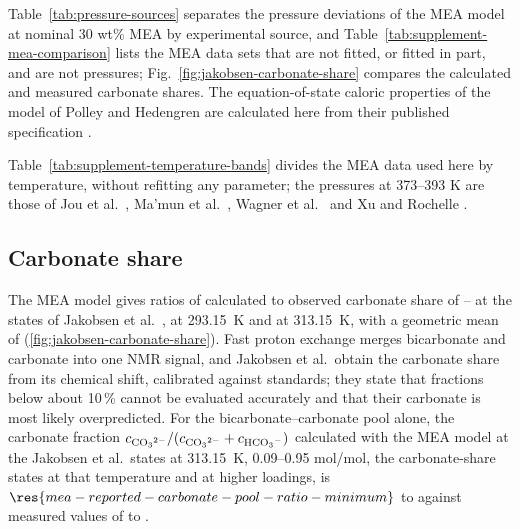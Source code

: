 \documentclass[a4paper,11pt]{article}
\begin{document}
Table~\ref{tab:pressure-sources} separates the pressure deviations of the MEA model at nominal 30 wt\% MEA by experimental source, and Table~\ref{tab:supplement-mea-comparison} lists the MEA data sets that are not fitted, or fitted in part, and are not pressures; Fig.~\ref{fig:jakobsen-carbonate-share} compares the calculated and measured carbonate shares.
The equation-of-state caloric properties of the model of Polley and Hedengren are calculated here from their published specification \cite{polleyReactiveEPCSAFTModeling2026}.




Table~\ref{tab:supplement-temperature-bands} divides the MEA data used here by temperature, without refitting any parameter; the  pressures at 373--393 K are those of Jou et al.\ \cite{Jou1995}, Ma'mun et al.\ \cite{Mamun2005}, Wagner et al.\ \cite{wagnerSolubilityCarbonDioxide2013} and Xu and Rochelle \cite{Xu2011}.



\subsection{Carbonate share}\label{sec:s-carbonate}
The MEA model gives ratios of calculated to observed carbonate share of -- at the  states of Jakobsen et al.\ \cite{Jakobsen2005},  at \SI{293.15}{\kelvin} and  at \SI{313.15}{\kelvin}, with a geometric mean of  (\cref{fig:jakobsen-carbonate-share}).
Fast proton exchange merges bicarbonate and carbonate into one  NMR signal, and Jakobsen et al.\ obtain the carbonate share from its chemical shift, calibrated against standards; they state that fractions below about 10\,\% cannot be evaluated accurately and that their carbonate is most likely overpredicted.
For the bicarbonate--carbonate pool alone, the carbonate fraction $c_{\ce{CO3^{2-}}}/(c_{\ce{CO3^{2-}}}+c_{\ce{HCO3-}})$ calculated with the MEA model at the  Jakobsen et al.\ states at \SI{313.15}{\kelvin}, 0.09--0.95 mol/mol, the  carbonate-share states at that temperature and  at higher loadings, is $\res{mea-reported-carbonate-pool-ratio-minimum}$ to  against measured values of  to .
\end{document}
